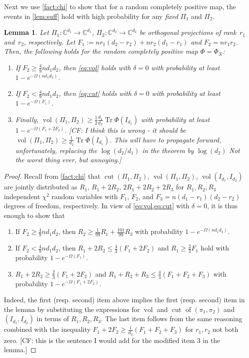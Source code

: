 \documentclass[aos]{imsart}
\newtheorem{lemma}[theorem]{Lemma}
\theoremstyle{definition}
\numberwithin{equation}{section}
\DeclareMathOperator{\vol}{vol}
\DeclareMathOperator{\cut}{cut}
\DeclareMathOperator{\tr}{Tr}
\newcommand{\C}{{\mathbb{C}}}
\newcommand{\CF}[1]{{\color{purple}[CF: #1]}}
\newcommand{\CF}[1]{{}}
\begin{document}
\begin{appendix}
Next we use \cref{fact:chi} to show that for a random completely positive map, the events in \cref{lem:suff} hold with high probability for any \emph{fixed} $\Pi_1$ and $\Pi_2$.

\begin{lemma}\label{lem:probabilities}
Let $\Pi_1\colon \C^{d_1} \to \C^{d_1}$, $\Pi_2\colon \C^{d_2} \to \C^{d_2}$ be orthogonal projections of rank~$r_1$ and~$r_2$, respectively.
Let $F_1:= n r_1(d_2 - r_2) + n r_2(d_1-r_1)$ and $F_2 = n r_1 r_2$.
Then, the following holds for the random completely positive map $\Phi=\Phi_X$:
\begin{enumerate}
\item If $F_2 \geq \frac49 n d_1 d_2$, then \cref{eq:vol} holds with $\delta = 0$ with probability at least $1 - e^{-\Omega( n d_1 d_2)}$.
\item If $F_2 < \frac49 n d_1 d_2$, then \cref{eq:cut} holds with $\delta = 0$ with probability at least $1 - e^{-\Omega( F_1)}$.
\item Finally, $\vol(\Pi_1, \Pi_2) \geq \frac12 \frac{d_1}{d_2} \tr \Phi(I_{d_1})$ with probability at least $1 - e^{- \Omega(F_1 + 2F_2)}$. \CF{I think this is wrong - it should be $\vol(\Pi_1, \Pi_2) \geq  \frac{1}{d_2} \tr \Phi(I_{d_1}).$ This will have to propagate forward, unfortunately, replacing the $\log(d_2/d_1)$ in the theorem by $\log (d_2)$ Not the worst thing ever, but annoying.}
\end{enumerate}
\end{lemma}
\begin{proof}
Recall from \cref{fact:chi} that $\cut(\Pi_1, \Pi_2)$, $\vol(\Pi_1, \Pi_2)$, $\vol(I_{d_1}, I_{d_2})$ are jointly distributed as $R_1$, $R_1 + 2R_2$, $2R_1 + 2R_2 + 2R_3$ for $R_1, R_2, R_3$ independent $\chi^2$ random variables with $F_1$, $F_2$, and $F_3 = n(d_1-r_1)(d_2-r_2)$ degrees of freedom, respectively.
In view of \cref{eq:vol,eq:cut} with $\delta=0$, it is thus enough to show that
\begin{enumerate}
\item If $F_2 \geq \frac49 n d_1 d_2$, then $R_2 \geq \frac1{99} R_1 + \frac{101}{99} R_3$ with probability $1 - e^{-\Omega( n d_1 d_2)}$.
\item If $F_2 < \frac49 n d_1 d_2$, then $R_1 + 2R_2 \leq \frac43 (F_1 + 2F_2)$ and $R_1 \geq \frac23 F_1$ hold with probability $1 - e^{-\Omega(F_1)}$.
\item $R_1 + 2 R_2 \geq \frac23 (F_1 + 2F_2)$ and $R_1 + R_2 + R_3 \leq \frac43 (F_1 + F_2 + F_3)$ with probability $1 - e^{- \Omega(F_1 + 2F_2)}$.
\end{enumerate}
Indeed, the first (resp. second) item above implies the first (resp. second) item in the lemma by substituting the expressions for $\vol$ and $\cut $ of $(\pi_1, \pi_2)$ and $(I_{d_1}, I_{d_2})$ in terms of $R_1, R_2, R_3$. The last item follows from the same reasoning combined with the inequality $F_1 + 2 F_2 \geq \frac{1}{d_2} (F_1 + F_2 + F_3)$ for $r_1, r_2$ not both zero. \CF{this is the sentence I would add for the modified item 3 in the lemma.}


\end{proof}
\end{appendix}
\end{document}
